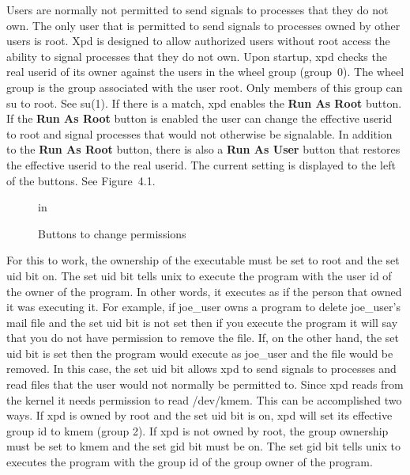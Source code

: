 Users are normally not permitted to send signals to processes that they do not own.
The only user that is permitted to send signals to processes owned by other users is root.
Xpd is designed to allow authorized users without root access the ability to signal processes that they do not own.
Upon startup, xpd checks the real userid of its owner against the users in the wheel group (group~0).
The wheel group is the group associated with the user root.
Only members of this group can su to root.
See su(1).
If there is a match, xpd enables the {\bf Run As Root} button.
If the {\bf Run As Root} button is enabled the user can change the effective userid to root and signal processes that would not otherwise be signalable.
In addition to the {\bf Run As Root} button, there is also a {\bf Run As User} button that restores the effective userid to the real userid.
The current setting is displayed to the left of the buttons.
See Figure~4.1.

\begin{figure}[h]
    in
   \caption{Buttons to change permissions}
\end{figure}

For this to work, the ownership of the executable must be set to root and the set uid bit on.
The set uid bit tells unix to execute the program with the user id of the owner of the program.
In other words, it executes as if the person that owned it was executing it.
For example, if joe\_user owns a program to delete joe\_user's mail file and the set uid bit is not set then if you execute the program it will say that you do not have permission to remove the file.
If, on the other hand, the set uid bit is set then the program would execute as joe\_user and the file would be removed.
In this case, the set uid bit allows xpd to send signals to processes and read files that the user would not normally be permitted to.
Since xpd reads from the kernel it needs permission to read /dev/kmem.
This can be accomplished two ways.
If xpd is owned by root and the set uid bit is on, xpd will set its effective group id to kmem (group 2).
If xpd is not owned by root, the group ownership must be set to kmem and the set gid bit must be on.
The set gid bit tells unix to executes the program with the group id of the group owner of the program.

